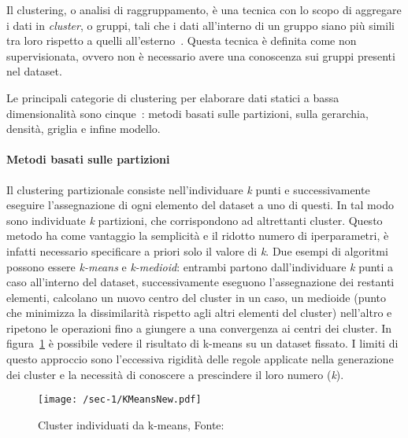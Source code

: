 Il clustering, o analisi di raggruppamento, è una tecnica con lo scopo di aggregare i dati in \textit{cluster}, o gruppi,
tali che i dati all'interno di un gruppo siano più simili tra loro rispetto a quelli all'esterno~\cite*{liao2005clustering, zazzarro2009clustering}.
Questa tecnica è definita come non supervisionata, ovvero non è necessario avere una conoscenza
sui gruppi presenti nel dataset.

Le principali categorie di clustering per elaborare dati statici a bassa dimensionalità sono cinque~\cite{han2011data}:
metodi basati sulle partizioni, sulla gerarchia, densità, griglia e infine modello.


\paragraph{Metodi basati sulle partizioni}
Il clustering partizionale consiste nell'individuare \textit{k} punti e successivamente
eseguire l'assegnazione di ogni elemento del dataset a uno di questi.
In tal modo sono individuate \textit{k} partizioni, che corrispondono ad altrettanti cluster.
Questo metodo ha come vantaggio la semplicità e il ridotto numero di iperparametri,
è infatti necessario specificare a priori solo il valore di \textit{k}.
Due esempi di algoritmi~\cite{arora2016analysis} possono essere \textit{k-means} e \textit{k-medioid}:
entrambi partono dall'individuare \textit{k} punti a caso all'interno del dataset, successivamente eseguono l'assegnazione dei restanti elementi,
calcolano un nuovo centro del cluster in un caso, un medioide (punto che minimizza la dissimilarità rispetto agli altri elementi del cluster) nell'altro e ripetono le operazioni fino a giungere a una convergenza ai centri dei cluster.
In figura~\cref{fig:chap-1:k-means-overview} è possibile vedere il risultato di k-means su un dataset fissato.
I limiti di questo approccio sono l'eccessiva rigidità delle regole applicate nella generazione dei cluster e la necessità di conoscere a prescindere il loro numero (\textit{k}).

\begin{figure}
  \centering
  \texttt{[image: /sec-1/KMeansNew.pdf]}
  \caption{Cluster individuati da  k-means, Fonte:~\cite{KMeansDa64:online}}%
  \label{fig:chap-1:k-means-overview}
\end{figure}


